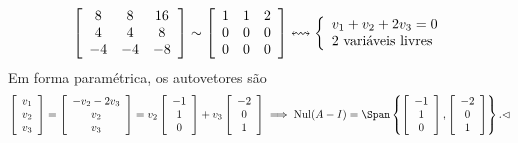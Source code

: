 \begin{ex}
\begin{itemize}
		\begin{equation}
		\left[
		\begin{array}{ccc}
		8 &  8 & 16 \\
		4 &  4 & 8 \\
		-4 & -4 & -8
		\end{array}
		\right] \sim \left[
		\begin{array}{ccc}
		1 &  1 & 2 \\
		0 &  0 & 0 \\
		0 &  0 & 0
		\end{array}
		\right] \leftrightsquigarrow
		\left\{
		\begin{array}{ll}
		v_1 + v_2 + 2v_3 = 0 \\
		\hbox{2 variáveis livres}
		\end{array}
		\right.
		\end{equation} Em forma paramétrica, os autovetores são
		\begin{equation}
		\left[
		\begin{array}{ccc}
		v_1 \\
		v_2 \\
		v_3 \\
		\end{array}
		\right] =
		\left[
		\begin{array}{ccc}
		- v_2 - 2 v_3 \\
		v_2 \\
		v_3
		\end{array}
		\right] = v_2
		\left[
		\begin{array}{ccc}
		-1 \\
		1 \\
		0
		\end{array}
		\right] + v_3
		\left[
		\begin{array}{ccc}
		-2 \\
		0 \\
		1
		\end{array}
		\right] \implies \operatorname{Nul} (A - I) = \Span \left\{ \left[
		\begin{array}{c}
		-1 \\
		1 \\
		0
		\end{array}
		\right], \left[
		\begin{array}{ccc}
		-2 \\
		0 \\
		1
		\end{array}
		\right] \right\}. \lhd
		\end{equation}
	\end{itemize}
\end{ex}

